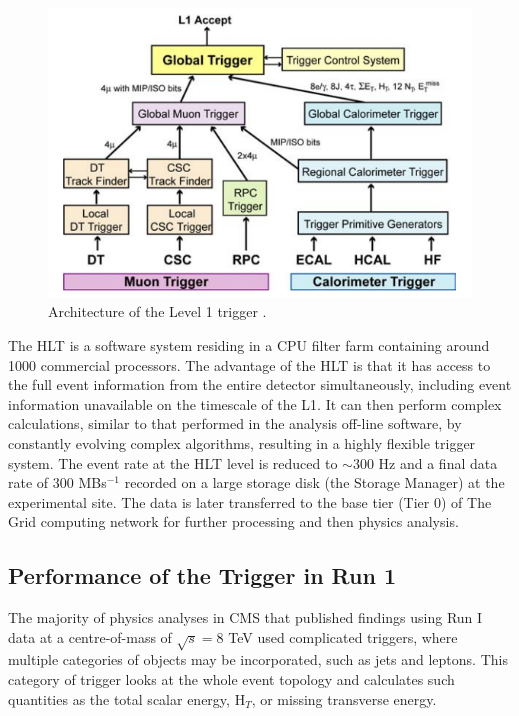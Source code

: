 \begin{figure} 
\begin{center}
\includegraphics[scale=0.5]{Figures/L1Trigger.png}
\end{center}
\caption{Architecture of the Level 1 trigger \cite{CMSexperiment}.}
\label{fig-L1Trigger}
\end{figure}

The HLT is a software system residing in a CPU filter farm containing around 1000 commercial processors. The advantage of the HLT is that it has access to the full event information from the entire detector simultaneously, including event information unavailable on the timescale of the L1. It can then perform complex calculations, similar to that performed in the analysis off-line software, by constantly evolving complex algorithms, resulting in a highly flexible trigger system. The event rate at the HLT level is reduced to $\sim300$ Hz and a final data rate of $300$ MBs$^{-1}$ recorded on a large storage disk (the Storage Manager) at the experimental site. The data is later transferred to the base tier (Tier 0) of The Grid computing network for further processing and then physics analysis.

\subsection{Performance of the Trigger in Run 1} \label{subsec-TriggerPerformance}

The majority of physics analyses in CMS that published findings using Run I data at a centre-of-mass of $\sqrt{s}=8$ TeV used complicated triggers, where multiple categories of objects may be incorporated, such as jets and leptons. This category of trigger looks at the whole event topology and calculates such quantities as the total scalar energy, H$_T$, or missing transverse energy. 

